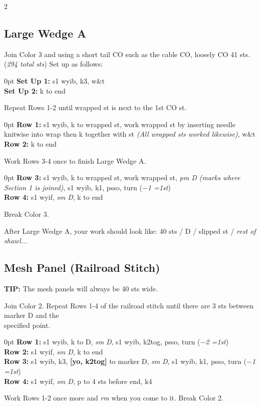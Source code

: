 \documentclass[12pt]{article}
\newcommand{\rowDir}[1]{\textbf{#1:}} %
\renewcommand{\repeat}[1]{\textbf{[#1]}} %
\newcommand{\decrease}[1]{(\emph{$-$#1
	\ifnum#1=1{st}\else{sts}\fi})}
\newcommand{\stitchcount}[1]{(\emph{#1 sts})}
\renewcommand{\pm}[1]{\emph{pm #1}} %
\newcommand{\sm}{\emph{sm}} %
\renewcommand{\rm}[1]{\emph{rm #1}} %
\newenvironment{frnote}
    {%
    	\setlength{\FrameRule}{1.5pt}
    	\def\FrameCommand{\fboxrule=\FrameRule\fboxsep=\FrameSep \fcolorbox{framecolor}{shadecolor}}
    	\MakeFramed {\FrameRestore}}
    {\setlength{\FrameRule}{1pt}
	\endMakeFramed}
\newenvironment{unframed}
    {%
\begin{addmargin}[2em]{0pt}
	\setlength{\parindent}{-2em}}
    {\setlength{\parindent}{0em}
	\end{addmargin}}
\begin{document}
\begin{multicols}{2}
\small

\subsection*{Large Wedge A}

Join Color 3 and using a short tail CO such as the cable CO, loosely CO 41 sts. \stitchcount{294 total} Set up as follows:
\begin{unframed}
\rowDir{Set Up 1} s1 wyib, k3, w\&t \\
\rowDir{Set Up 2} k to end
\end{unframed}
Repeat Rows 1-2 until wrapped st is next to the 1st CO st.
\begin{unframed}
\rowDir{Row 1} s1 wyib, k to wrapped st, work wrapped st by inserting needle knitwise into wrap then k together with st \emph{(All wrapped sts worked likewise)}, w\&t \\
\rowDir{Row 2} k to end
\end{unframed}

Work Rows 3-4 once to finish Large Wedge A.

\begin{unframed}
\rowDir{Row 3} s1 wyib, k to wrapped st, work wrapped st, \pm{D} \emph{(marks where Section 1 is joined)}, s1 wyib, k1, psso, turn \decrease{1} \\
\rowDir{Row 4} s1 wyif, \sm{} \emph{D}, k to end
\end{unframed}

 Break Color 3. 
\vspace{1em}

After Large Wedge A, your work should look like: 40 sts / D / slipped st / \emph{rest of shawl...}


\vfill
\columnbreak
\subsection*{Mesh Panel (Railroad Stitch)}

\begin{frnote}
\textbf{TIP:} The mesh panels will always be 40 sts wide.
\end{frnote}

Join Color 2. Repeat Rows 1-4 of the railroad stitch until there are 3 sts between marker D and the \\ specified point. 
\begin{unframed}
\rowDir{Row 1} s1 wyib, k to D, \sm{} \emph{D}, s1 wyib, k2tog, psso, turn \decrease{2} \\
\rowDir{Row 2} s1 wyif, \sm{} \emph{D}, k to end \\
\rowDir{Row 3} s1 wyib, k3, \repeat{yo, k2tog} to marker D, \sm{} \emph{D}, s1 wyib, k1, psso, turn \decrease{1} \\
\rowDir{Row 4} s1 wyif, \sm{} \emph{D}, p to 4 sts before end, k4
\end{unframed} 
Work Rows 1-2 once more and \rm{}when you come to it. Break Color 2.


\end{multicols}
\end{document}

